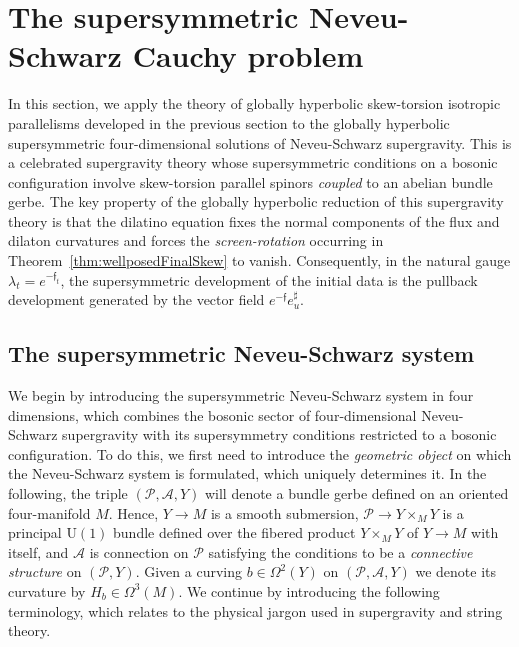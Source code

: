 \documentclass[10pt,reqno,a4paper]{amsart}
\theoremstyle{plain}
\theoremstyle{definition}
\theoremstyle{remark}
\theoremstyle{remark}
\def\U{\mathrm{U}}
\def\cA{\mathcal{A}}
\def\cP{\mathcal{P}}
\renewcommand{\(}{ (}
\renewcommand{\)}{ )}
\newcommand{\frf}{\mathfrak{f}}
\begin{document}
 

%
%
%
%

\section{The supersymmetric Neveu-Schwarz Cauchy problem}
\label{sec:Globallyhyperbolicsusy}

%
%
%
%

In this section, we apply the theory of globally hyperbolic skew-torsion isotropic parallelisms developed in the previous section to the globally hyperbolic supersymmetric four-dimensional solutions of Neveu-Schwarz supergravity. This is a celebrated supergravity theory whose supersymmetric conditions on a bosonic configuration involve skew-torsion parallel spinors \emph{coupled} to an abelian bundle gerbe. The key property of the globally hyperbolic reduction of this supergravity theory is that the dilatino equation fixes the normal components of the flux and dilaton curvatures and forces the \emph{screen-rotation} occurring in Theorem~\ref{thm:wellposedFinalSkew} to vanish.  Consequently, in the natural gauge $\lambda_t=e^{-\frf_t}$, the supersymmetric development of the initial data is the pullback development generated by the vector field $e^{-\frf}e^{\sharp}_u$. 

%

\subsection{The supersymmetric Neveu-Schwarz system}
\label{sec:NSNSsystem}

%

We begin by introducing the supersymmetric Neveu-Schwarz system in four dimensions, which combines the bosonic sector of four-dimensional Neveu-Schwarz supergravity with its supersymmetry conditions restricted to a bosonic configuration. To do this, we first need to introduce the \emph{geometric object} on which the Neveu-Schwarz system is formulated, which uniquely determines it. In the following, the triple $(\cP, \cA, Y)$ will denote a bundle gerbe \cite{Murray,BehrendXu} defined on an oriented four-manifold $M$. Hence, $Y\to M$ is a smooth submersion, $\cP \to Y\times_M Y$ is a principal $\U(1)$ bundle defined over the fibered product $Y\times_M Y$ of $Y\to M$ with itself, and $\cA$ is connection on $\cP$ satisfying the conditions to be a \emph{connective structure} on $(\cP,Y)$. Given a curving $b\in \Omega^2(Y)$ on $(\cP, \cA, Y)$ we denote its curvature by $H_b\in \Omega^3(M)$. We continue by introducing the following terminology, which relates to the physical jargon used in supergravity and string theory.
 
\end{document}
